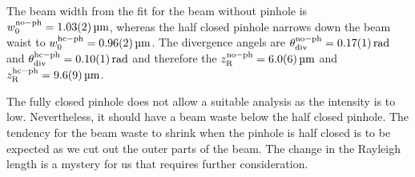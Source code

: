 The beam width from the fit for the beam without pinhole is $w_{\mathrm{0}}^{\mathrm{no-ph}} = \SI{1.03\pm0.02}{\micro\meter}$, whereas the half closed pinhole narrows down the beam waist to $w_{\mathrm{0}}^{\mathrm{hc-ph}} = \SI{0.96\pm0.02}{\micro\meter}$. The 
divergence angels are $\theta_{\mathrm{div}}^{\mathrm{no-ph}} = \SI{0.17\pm0.01}{rad}$ and $\theta_{\mathrm{div}}^{\mathrm{hc-ph}} = \SI{0.10\pm0.01}{rad}$ and therefore the $z_{\mathrm{R}}^{\mathrm{no-ph}} = \SI{6.0\pm0.6}{\micro\meter}$ and
$z_{\mathrm{R}}^{\mathrm{hc-ph}} = \SI{9.6\pm0.9}{\micro\meter}$.

The fully closed pinhole does not allow a suitable analysis as the intensity is to low. Nevertheless, it should have a beam waste below the half closed pinhole. 
The tendency for the beam waste to shrink when the pinhole is half closed is to be expected as we cut out the outer parts of the beam.
The change in the Rayleigh length is a mystery for us that requires further consideration.